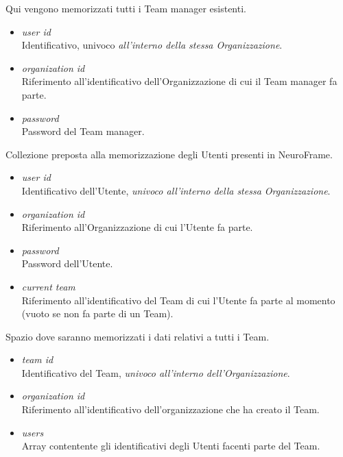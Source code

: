 \newline
Qui vengono memorizzati tutti i Team manager esistenti.
\begin{itemize}
  \item \emph{user id}\\
  {Identificativo, univoco \emph{all'interno della stessa Organizzazione}.}
  \item \emph{organization id}\\
  {Riferimento all'identificativo dell'Organizzazione di cui il Team manager fa parte.}
  \item \emph{password}\\
  {Password del Team manager.}
\end{itemize}

\newline
Collezione preposta alla memorizzazione degli Utenti presenti in NeuroFrame.
\begin{itemize}
  \item \emph{user id}\\
  {Identificativo dell'Utente, \emph{univoco all'interno della stessa Organizzazione}.}
  \item \emph{organization id}\\
  {Riferimento all'Organizzazione di cui l'Utente fa parte.}
  \item \emph{password}\\
  {Password dell'Utente.}
  \item \emph{current team}\\
  {Riferimento all'identificativo del Team di cui l'Utente fa parte al momento (vuoto se non fa parte di un Team).}
\end{itemize}

\newline
Spazio dove saranno memorizzati i dati relativi a tutti i Team.
\begin{itemize}
  \item \emph{team id}\\
  {Identificativo del Team, \emph{univoco all'interno dell'Organizzazione}.}
  \item \emph{organization id}\\
  {Riferimento all'identificativo dell'organizzazione che ha creato il Team.}
  \item \emph{users}\\
  {Array contentente gli identificativi degli Utenti facenti parte del Team.}
\end{itemize}


